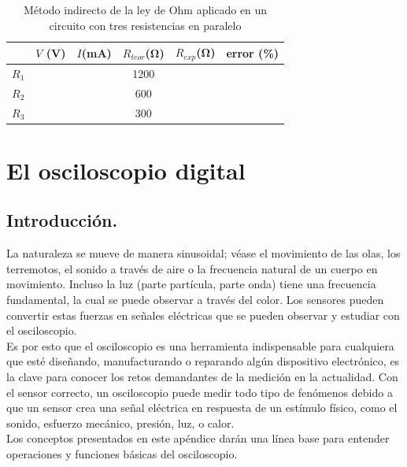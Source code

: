 \documentclass[12pt,letterpaper]{report}
\begin{document}
\begin{table}[H]
	\caption{Método indirecto de la ley de Ohm aplicado en un circuito con tres resistencias en paralelo}
	\label{tab:L1T4}
	\centering
	\vspace{0.5cm}
    \begin{tabularx}{14cm}{CCCCCC}
		\toprule
		&$V$ (\si{V}) & $I$(\si{\milli\ampere}) & $R_{teor}$(\si{\ohm}) & $R_{exp}$(\si{\ohm}) & error (\%)\\
		\midrule
	    $R_1$ & & &1200 & & \\
		$R_2$ & & &600 & & \\
		$R_3$ & & &300 & & \\
		\bottomrule
	\end{tabularx}
\end{table}


\appendix
\chapter{El osciloscopio digital}
\label{ap:osc}
\section{Introducción.} La naturaleza se mueve de manera sinusoidal; véase el movimiento de las olas, los terremotos, el sonido a través de aire o la frecuencia natural de un cuerpo en movimiento. Incluso la luz (parte partícula, parte onda) tiene una frecuencia fundamental, la cual se puede observar a través del color. Los sensores pueden convertir estas fuerzas en señales eléctricas que se pueden observar y estudiar con el osciloscopio.\\
Es por esto que el osciloscopio es una herramienta indispensable para cualquiera que esté diseñando, manufacturando o reparando algún dispositivo electrónico, es la clave para conocer los retos demandantes de la medición en la actualidad. Con el sensor correcto, un osciloscopio puede medir todo tipo de fenómenos debido a que un sensor crea una señal eléctrica en respuesta de un estímulo físico, como el sonido, esfuerzo mecánico, presión, luz, o calor.\\
Los conceptos presentados en este apéndice darán una línea base para entender operaciones y funciones básicas del osciloscopio.
\end{document}
